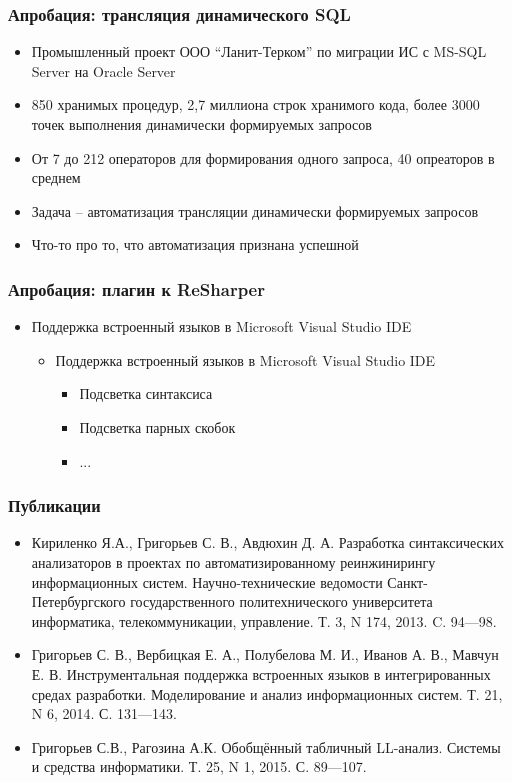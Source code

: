 \documentclass{beamer}
\begin{document}
\begin{frame}[t]
    \transwipe[direction=90]
    \frametitle{Апробация: трансляция динамического SQL}
    \begin{itemize}
        \item Промышленный проект ООО ``Ланит-Терком'' по миграции ИС с MS-SQL Server на Oracle Server
        \item 850 хранимых процедур, 2,7 миллиона строк хранимого кода, более 3000 точек выполнения динамически формируемых запросов
        \item От 7 до 212 операторов для формирования одного запроса, 40 опреаторов в среднем
        \item Задача -- автоматизация трансляции динамически формируемых запросов
        \item Что-то про то, что автоматизация признана успешной
    \end{itemize}
\end{frame}

\begin{frame}[t]
    \transwipe[direction=90]
    \frametitle{Апробация: плагин к ReSharper}
    \begin{itemize}
        \item Поддержка встроенный языков в Microsoft Visual Studio IDE
        \begin{itemize}
            \item Поддержка встроенный языков в Microsoft Visual Studio IDE
            \begin{itemize}
                \item Подсветка синтаксиса
                \item Подсветка парных скобок
                \item ...
            \end{itemize}
        \end{itemize}
    \end{itemize}
\end{frame}

\begin{frame}
    \transwipe[direction=90]
    \frametitle{Публикации}
  \begin{itemize}
      \item Кириленко Я.А., Григорьев С. В., Авдюхин Д. А. Разработка синтаксических анализаторов в проектах по автоматизированному реинжинирингу информационных систем.  Научно-технические ведомости Санкт-Петербургского государственного политехнического университета информатика, телекоммуникации, управление. Т. 3, N 174, 2013. C. 94---98.
      \item Григорьев С. В., Вербицкая Е. А., Полубелова М. И., Иванов А. В., Мавчун Е. В. Инструментальная поддержка встроенных языков в интегрированных средах разработки. Моделирование и анализ информационных систем. Т. 21, N 6, 2014. С. 131---143.
      \item Григорьев С.В., Рагозина А.К. Обобщённый табличный LL-анализ. Системы и средства информатики. Т. 25, N 1, 2015. С. 89---107.
  \end{itemize} 
\end{frame}
\end{document}
